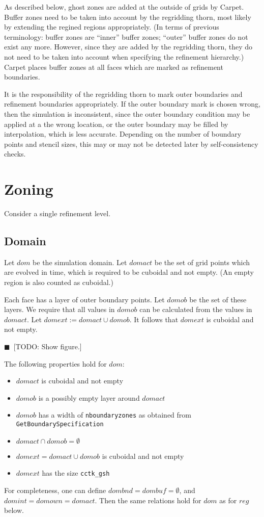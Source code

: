\documentclass[nofootinbib, twocolumn]{revtex4}
\newcommand{\todo}[1]{{\color{blue}$\blacksquare$~\textsf{[TODO: #1]}}}
\begin{document}
As described below, ghost zones are added at the outside of grids by
Carpet.  Buffer zones need to be taken into account by the regridding
thorn, most likely by extending the regined regions appropriately.
(In terms of previous terminology: buffer zones are ``inner'' buffer
zones; ``outer'' buffer zones do not exist any more.  However, since
they are added by the regridding thorn, they do not need to be taken
into account when specifying the refinement hierarchy.)  Carpet places
buffer zones at all faces which are marked as refinement boundaries.

It is the responsibility of the regridding thorn to mark outer
boundaries and refinement boundaries appropriately.  If the outer
boundary mark is chosen wrong, then the simulation is inconsistent,
since the outer boundary condition may be applied at a the wrong
location, or the outer boundary may be filled by interpolation, which
is less accurate.  Depending on the number of boundary points and
stencil sizes, this may or may not be detected later by
self-consistency checks.



\section{Zoning}

Consider a single refinement level.

\subsection{Domain}

Let $dom$ be the simulation domain.  Let $domact$ be the set of grid
points which are evolved in time, which is required to be cuboidal and
not empty.  (An empty region is also counted as cuboidal.)

Each face has a layer of outer boundary points.  Let $domob$ be the
set of these layers.  We require that all values in $domob$ can be
calculated from the values in $domact$.  Let $domext :=domact \cup
domob$.  It follows that $domext$ is cuboidal and not empty.

\todo{Show figure.}

The following properties hold for $dom$:
\begin{itemize}
\item $domact$ is cuboidal and not empty
\item $domob$ is a possibly empty layer around $domact$
\item $domob$ has a width of \texttt{nboundaryzones} as obtained from
  \texttt{GetBoundarySpecification}
\item $domact \cap domob = \emptyset$
\item $domext = domact \cup domob$ is cuboidal and not empty
\item $domext$ has the size \texttt{cctk\_gsh}
\end{itemize}
For completeness, one can define $dombnd = dombuf = \emptyset$, and
$domint = domown = domact$.  Then the same relations hold for $dom$ as
for $reg$ below.
\end{document}
